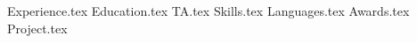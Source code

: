 \documentclass[11pt, a4paper]{awesome-cv}
\newcommand*{\sectiondir}{resume/}
\begin{document}
\makecvheader
\hspace{14.17 cm}


{Experience.tex}
\vspace{0.5 cm}
{Education.tex}
\vspace{0.5 cm}
{TA.tex}
\vspace{0.5 cm}
{Skills.tex}
\vspace{0.5 cm}
{Languages.tex}
\vspace{0.5 cm}
\newpage
{Awards.tex}
\vspace{0.5 cm}
{Project.tex}
\vspace{0.5 cm}
\end{document}
